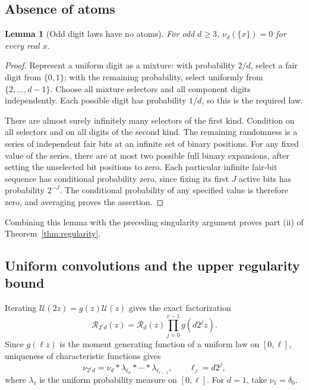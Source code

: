 \documentclass[11pt,letterpaper]{article}
\numberwithin{equation}{section}
\newtheorem{lemma}[theorem]{Lemma}
\theoremstyle{definition}
\theoremstyle{remark}
\newcommand{\Up}{\mathcal U}
\newcommand{\Rp}{\mathcal R}
\begin{document}
\subsection{Absence of atoms}
\begin{lemma}[Odd digit laws have no atoms]
For odd \(d\geq3\), \(\nu_d(\{x\})=0\) for every real \(x\).
\end{lemma}
\begin{proof}
Represent a uniform digit as a mixture: with probability \(2/d\), select a fair digit from \(\{0,1\}\); with the remaining probability, select uniformly from \(\{2,\ldots,d-1\}\). Choose all mixture selectors and all component digits independently. Each possible digit has probability \(1/d\), so this is the required law.

There are almost surely infinitely many selectors of the first kind. Condition on all selectors and on all digits of the second kind. The remaining randomness is a series of independent fair bits at an infinite set of binary positions. For any fixed value of the series, there are at most two possible full binary expansions, after setting the unselected bit positions to zero. Each particular infinite fair-bit sequence has conditional probability zero, since fixing its first \(J\) active bits has probability \(2^{-J}\). The conditional probability of any specified value is therefore zero, and averaging proves the assertion.
\end{proof}
Combining this lemma with the preceding singularity argument proves part (ii) of Theorem~\ref{thm:regularity}.

\subsection{Uniform convolutions and the upper regularity bound}
Iterating \(\Up(2z)=g(z)\Up(z)\) gives the exact factorization
\begin{equation}
 \Rp_{2^rd}(z)=\Rp_d(z)\prod_{j=0}^{r-1}g(d2^jz).
 \label{eq:smoothingfactor}
\end{equation}
Since \(g(\ell z)\) is the moment generating function of a uniform law on \([0,\ell]\), uniqueness of characteristic functions gives
\begin{equation}
 \nu_{2^rd}=\nu_d*\lambda_{\ell_0}*\cdots*\lambda_{\ell_{r-1}},
 \qquad \ell_j=d2^j,
 \label{eq:convolutionlaw}
\end{equation}
where \(\lambda_\ell\) is the uniform probability measure on \([0,\ell]\). For \(d=1\), take \(\nu_1=\delta_0\).
\end{document}
